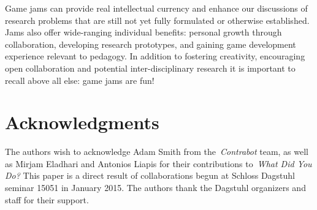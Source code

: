 \documentclass{acm_proc_article-sp}
\begin{document}
Game jams can provide real intellectual currency and enhance our discussions of research problems that are still not yet fully formulated or otherwise established.
Jams also offer wide-ranging individual benefits: personal growth through collaboration, developing research prototypes, and gaining game development experience relevant to pedagogy.
In addition to fostering creativity, encouraging open collaboration and potential inter-disciplinary research it is important to recall above all else: game jams are fun!



\section{Acknowledgments}
The authors wish to acknowledge Adam Smith from the~\textit{Contrabot} team, as well as Mirjam Eladhari and Antonios Liapis for their contributions to~\textit{What Did You Do?}
This paper is a direct result of collaborations begun at Schloss Dagstuhl seminar 15051 in January 2015.  The authors thank the Dagstuhl organizers and staff for their support.




\end{document}
